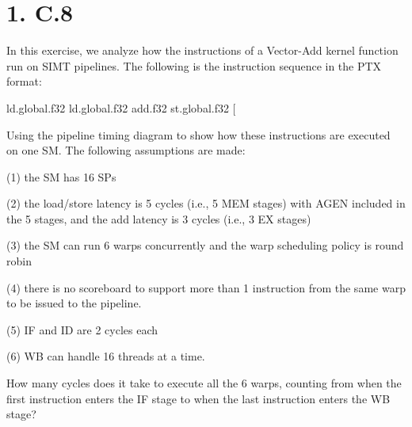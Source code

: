 \documentclass[11pt]{article}
\begin{document}
\section*{1. C.8}

In this exercise, we analyze how the instructions of a Vector-Add kernel function run on SIMT pipelines. The following is the instruction sequence in the PTX format:

ld.global.f32   %
ld.global.f32   %
add.f32           %
st.global.f32   [%

Using the pipeline timing diagram to show how these instructions are executed on one SM. The following assumptions are made: 

(1) the SM has 16 SPs

(2) the load/store latency is 5 cycles (i.e., 5 MEM stages) with AGEN included in the 5 stages, and the add latency is 3 cycles (i.e., 3 EX stages)

(3) the SM can run 6 warps concurrently and the warp scheduling policy is round robin

(4) there is no scoreboard to support more than 1 instruction from the same warp to be issued to the pipeline. 

(5) IF and ID are 2 cycles each

(6) WB can handle 16 threads at a time.

How many cycles does it take to execute all the 6 warps, counting from when the first instruction enters the IF stage to when the last instruction enters the WB stage?

\newpage
\end{document}
